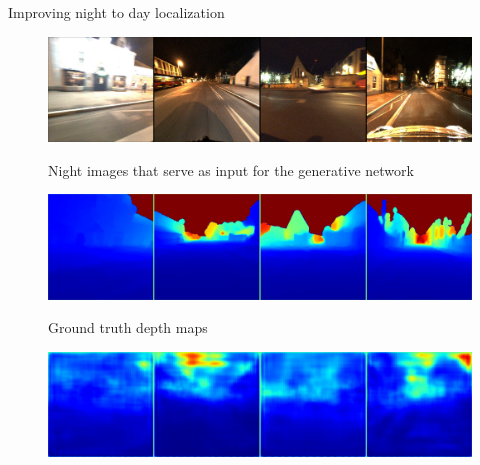 \begin{frame}{Improving night to day localization}
\centering
\begin{minipage}{0.7\linewidth}
	\centering
	
	\begin{figure}
		\centering
		\begin{minipage}{0.74\linewidth}
			\includegraphics[width=\linewidth]{im/res/night_input}
		\end{minipage}
		\begin{minipage}{0.21\linewidth}
			\raggedright \footnotesize
			Night images that serve as input for the generative network
		\end{minipage}
	\end{figure}
	\vspace{-0.5cm}
	\begin{figure}
		\centering
		\begin{minipage}{0.74\linewidth}
			\includegraphics[width=\linewidth]{im/res/night_gt}
		\end{minipage}
		\begin{minipage}{0.21\linewidth}
			\raggedright \footnotesize
			Ground truth depth maps
		\end{minipage}
	\end{figure}	
	\vspace{-0.5cm}
	\begin{figure}
		\centering
		\begin{minipage}{0.74\linewidth}
			\includegraphics[width=\linewidth]{im/res/night_noft}

\end{minipage}
\end{figure}
\end{minipage}
\end{frame}
